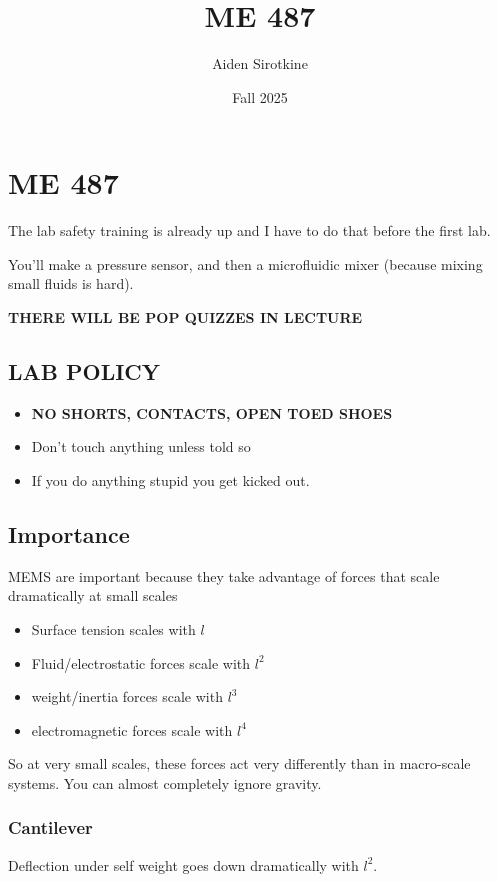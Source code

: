 \documentclass[fleqn]{report}
\date{Fall 2025}
\title{ME 487}
\author{Aiden Sirotkine}
\begin{document}
\pagestyle{fancy}
\maketitle
\tableofcontents
\clearpage

\chapter{ME 487}
The lab safety training is already up and I have to do that before the first lab.

You'll make a pressure sensor, and then a microfluidic mixer (because mixing small
fluids is hard).

\textbf{THERE WILL BE POP QUIZZES IN LECTURE}

\section{LAB POLICY}
\begin{itemize}
    \item
    \textbf{NO SHORTS, CONTACTS, OPEN TOED SHOES}
    \item 
    Don't touch anything unless told so 
    \item 
    If you do anything stupid you get kicked out.
\end{itemize}

\section{Importance}
MEMS are important because they take advantage of forces that scale dramatically 
at small scales 

\begin{itemize}
    \item 
    Surface tension scales with $l$ 
    \item 
    Fluid/electrostatic forces scale with $l^2$
    \item 
    weight/inertia forces scale with $l^3$
    \item
    electromagnetic forces scale with $l^4$
\end{itemize}

So at very small scales, these forces act very differently than in 
macro-scale systems. You can almost completely ignore gravity.

\subsection{Cantilever}
Deflection under self weight goes down dramatically with $l^2$.
\end{document}
